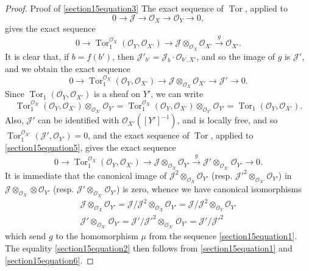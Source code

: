 \documentclass{article}
\theoremstyle{plain}
\theoremstyle{definition}
\newcommand{\sh}[1]{{\mathscr{#1}}}
\DeclareMathOperator{\Tor}{Tor}
\begin{document}
\begin{proof}{Proof of \cref{section15equation3}}
  The exact sequence of $\Tor$, applied to
  \[
    0\to\sh{J}\to\sh{O}_X\to\sh{O}_Y\to0,
  \]
  gives the exact sequence
  \[
    0 \to \Tor_1^{\sh{O}_X}(\sh{O}_Y,\sh{O}_{X'}) \to \sh{J}\otimes_{\sh{O}_X}\sh{O}_{X'} \xrightarrow{g} \sh{O}_{X'}.
  \]
  It is clear that, if $b=f(b')$, then $\sh{J}'_{b'}=\sh{J}_b\cdot\sh{O}_{b',X'}$, and so the image of $g$ is $\sh{J}'$, and we obtain the exact sequence
  \[
  \label{section15equation5}
    0 \to \Tor_1^{\sh{O}_X}(\sh{O}_Y,\sh{O}_{X'}) \to \sh{J}\otimes_{\sh{O}_X}\sh{O}_{X'} \to \sh{J}' \to 0.
    \tag{5}
  \]
  Since $\Tor_1(\sh{O}_Y,\sh{O}_{X'})$ is a sheaf on $Y'$, we can write
  \[
    \Tor_1^{\sh{O}_X}(\sh{O}_Y,\sh{O}_{X'})\otimes_{\sh{O}_{X'}}\sh{O}_{Y'}
    = \Tor_1^{\sh{O}_X}(\sh{O}_Y,\sh{O}_{X'})\otimes_{\sh{O}_{Y'}}\sh{O}_{Y'}
    = \Tor_1(\sh{O}_Y,\sh{O}_{X'}).
  \]
  Also, $\sh{J}'$ can be identified with $\sh{O}_{X'}([Y']^{-1})$, and is locally free, and so $\Tor_1^{\sh{O}_{X'}}(\sh{J}',\sh{O}_{Y'}) = 0$, and the exact sequence of $\Tor$, applied to \cref{section15equation5}, gives the exact sequence
  \[
  \label{section15equation6}
    0 \to \Tor_1^{\sh{O}_X}(\sh{O}_Y,\sh{O}_{X'}) \to \sh{J}\otimes_{\sh{O}_X}\sh{O}_{Y'} \xrightarrow{g} \sh{J}'\otimes_{\sh{O}_{X'}}\sh{O}_{Y'} \to 0.
    \tag{6}
  \]
  It is immediate that the canonical image of $\sh{J}^2\otimes_{\sh{O}_X}\sh{O}_{Y'}$ (resp. $\sh{J}'^2\otimes_{\sh{O}_{X'}}\sh{O}_{Y'}$) in $\sh{J}\otimes_{\sh{O}_X}\otimes\sh{O}_{Y'}$ (resp. $\sh{J}'\otimes_{\sh{O}_{X'}}\sh{O}_{Y'}$) is zero, whence we have canonical isomorphisms
  \begin{gather*}
    \sh{J}\otimes_{\sh{O}_X}\sh{O}_{Y'}
    = \sh{J}/\sh{J}^2\otimes_{\sh{O}_X}\sh{O}_{Y'}
    = \sh{J}/\sh{J}^2\otimes_{\sh{O}_Y}\sh{O}_{Y'}
  \\\sh{J}'\otimes_{\sh{O}_{X'}}\sh{O}_{Y'}
    = \sh{J}'/\sh{J}'^2\otimes_{\sh{O}_{X'}}\sh{O}_{Y'}
    = \sh{J}'/\sh{J}'^2
  \end{gather*}
  which send $g$ to the homomorphism $\mu$ from the sequence \cref{section15equation1}.
  The equality \cref{section15equation2} then follows from \cref{section15equation1} and \cref{section15equation6}.


\end{proof}
\end{document}
